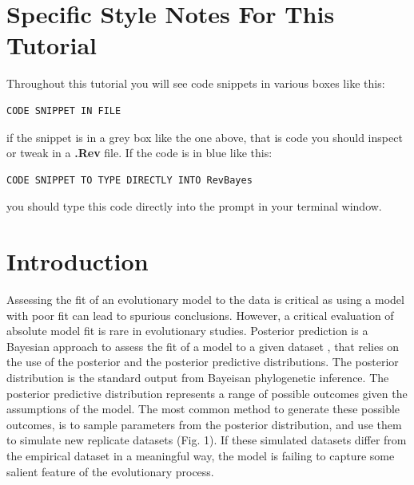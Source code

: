\section{Specific Style Notes For This Tutorial}
Throughout this tutorial you will see code snippets in various boxes like this: 
{\tt \begin{snugshade*}
\begin{lstlisting}
CODE SNIPPET IN FILE
\end{lstlisting}
\end{snugshade*}}

if the snippet is in a grey box like the one above, that is code you should inspect or tweak in a \textbf{.Rev} file.
If the code is in blue like this: 
{\tt \begin{Snugshade}[184,207,236]
\begin{lstlisting}
CODE SNIPPET TO TYPE DIRECTLY INTO RevBayes
\end{lstlisting}
\end{Snugshade}}
you should type this code directly into the \RevBayes prompt in your terminal window.

\section{Introduction}
Assessing the fit of an evolutionary model to the data is critical as using a model with poor fit can lead to 
spurious conclusions. However, a critical evaluation of absolute model fit is rare in evolutionary studies.
Posterior prediction is a Bayesian approach to assess the fit of a model to a given dataset \citep{Bollback2002-ki,Brown2014-jl,Gelman2014-ay},
that relies on the use of the posterior and the posterior predictive distributions. 
The posterior distribution is the standard output from Bayeisan phylogenetic inference. The posterior predictive 
distribution represents a range of possible outcomes given the assumptions of the model. The most common method to 
generate these possible outcomes, is to sample parameters from the posterior distribution, and use them 
to simulate new replicate datasets (Fig. 1). If these simulated datasets differ from the empirical dataset in a
meaningful way, the model is failing to capture some salient feature of the evolutionary process. 

